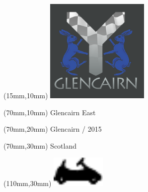 \null\newpage
\begin{textblock*}{50mm}(15mm,10mm)%
\includegraphics[width=50mm]{LG/GLCN.png}
\end{textblock*}
\begin{textblock*}{130mm}(70mm,10mm)%
{\fontsize{20}{20}\selectfont Glencairn East}\\
\end{textblock*}
\begin{textblock*}{120mm}(70mm,20mm)%
{\fontsize{16}{16}\selectfont Glencairn / 2015}\\
\end{textblock*}
\begin{textblock*}{120mm}(70mm,30mm)%
{\fontsize{12}{12}\selectfont Scotland}
\end{textblock*}
\begin{textblock*}{30mm}(110mm,30mm)%
\centering
\includegraphics[height=15mm]{icons/kart.pdf}
\end{textblock*}
